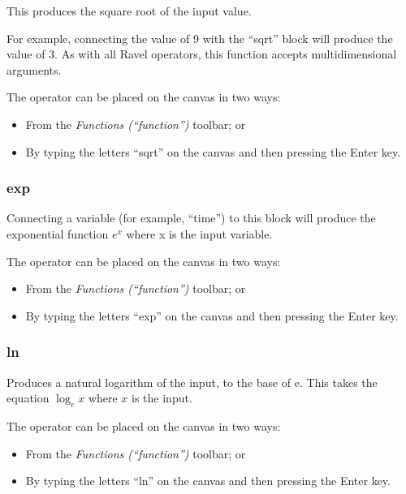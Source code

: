     
\label{Operation:sqrt} This produces the square root of the input
value.

For example, connecting the value of 9 with the ``sqrt'' block will
produce the value of 3. As with all Ravel operators, this function
accepts multidimensional arguments.

The operator can be placed on the canvas in two ways:
\begin{itemize}
\item From the \emph{Functions (``function'')} toolbar; or 
\item By typing the letters ``sqrt'' on the canvas and then pressing the
Enter key. 
\end{itemize}

\subsubsection{exp}


\label{Operation:exp} Connecting a variable (for example, ``time'')
to this block will produce the exponential function $e^{x}$ where
x is the input variable.

The operator can be placed on the canvas in two ways:
\begin{itemize}
\item From the \emph{Functions (``function'')} toolbar; or 
\item By typing the letters ``exp'' on the canvas and then pressing the
Enter key. 
\end{itemize}

\subsubsection{ln}


\label{Operation:ln} Produces a natural logarithm of the input, to
the base of e. This takes the equation $\log_{e}x$ where $x$ is
the input.

The operator can be placed on the canvas in two ways:
\begin{itemize}
\item From the \emph{Functions (``function'')} toolbar; or 
\item By typing the letters ``ln'' on the canvas and then pressing the Enter
key. 
\end{itemize}

